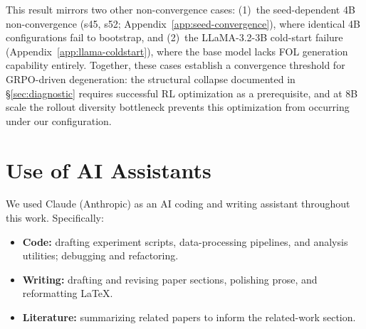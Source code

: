 This result mirrors two other non-convergence cases: (1)~the seed-dependent 4B non-convergence (s45, s52; Appendix~\ref{app:seed-convergence}), where identical 4B configurations fail to bootstrap, and (2)~the LLaMA-3.2-3B cold-start failure (Appendix~\ref{app:llama-coldstart}), where the base model lacks FOL generation capability entirely.
Together, these cases establish a convergence threshold for GRPO-driven degeneration: the structural collapse documented in \S\ref{sec:diagnostic} requires successful RL optimization as a prerequisite, and at 8B scale the rollout diversity bottleneck prevents this optimization from occurring under our configuration.

\section{Use of AI Assistants}
\label{app:ai-assistants}

We used Claude (Anthropic) as an AI coding and writing assistant throughout this work. Specifically:
\begin{itemize}
    \item \textbf{Code:} drafting experiment scripts, data-processing pipelines, and analysis utilities; debugging and refactoring.
    \item \textbf{Writing:} drafting and revising paper sections, polishing prose, and reformatting \LaTeX{}.
    \item \textbf{Literature:} summarizing related papers to inform the related-work section.
\end{itemize}
